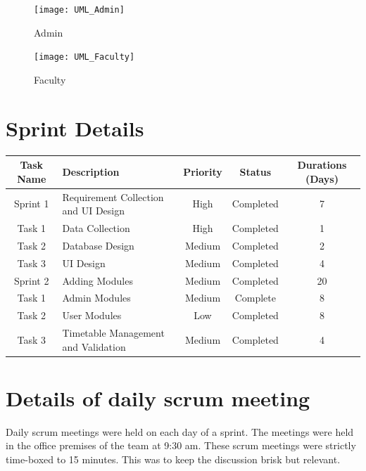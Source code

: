 \begin{figure}[!h]
	\begin{center}
		\texttt{[image: UML\_Admin]}
	\end{center}
\caption{Admin}
\end{figure}

\begin{figure}[!h]
	\begin{center}
		\texttt{[image: UML\_Faculty]}
	\end{center}
\caption{Faculty}
\end{figure}

\section{Sprint Details}
%
\renewcommand{\arraystretch}{1.25}
\begin{center}
\begin{tabular}{|c|p{4cm}|c|c|c|}
\hline
{\bf Task Name	} & {\bf Description} & {\bf Priority}	& {\bf Status} & {\bf 	Durations (Days)}\\
\hline
Sprint 1 & Requirement Collection and UI Design    &  High     &  Completed  &	 7\\
\hline
Task 1   &	Data Collection  &  High     &  Completed  &  1\\
\hline
Task 2	 & Database Design   &  Medium	&  Completed  &	 2\\
\hline
Task 3	 & UI Design    &  Medium   &  Completed  &	 4\\
\hline
Sprint 2	 & Adding Modules     &  Medium	&  Completed  &  20\\
\hline
Task 1	 & Admin Modules    &  Medium	&  Complete   &  8\\
\hline
Task 2  	 & User Modules	  &  Low	    &  Completed  &  8\\
\hline
Task 3   	& Timetable Management and Validation	  &   Medium	&  Completed  & 4\\
\hline
\end{tabular}
\end{center}
\renewcommand{\arraystretch}{1}
%
\section{Details of daily scrum meeting}
%
Daily scrum meetings were held on each day of a sprint. The meetings were held in the office premises of the team at 9:30 am. These scrum meetings were strictly time-boxed to 15 minutes. This was to keep the discussion brisk but relevant.

